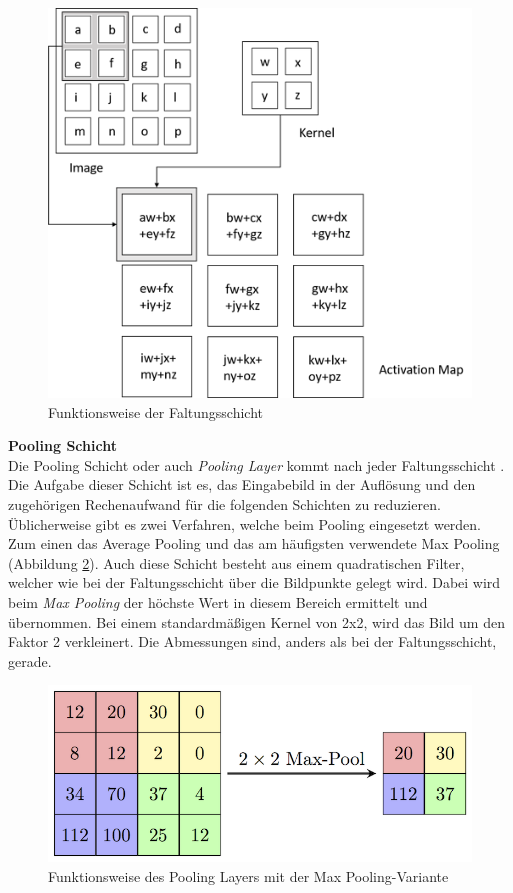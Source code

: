 \begin{figure}
	[h]
	\centering
	\includegraphics[scale=0.55]{Sources/CNN.png}
	\caption{Funktionsweise der Faltungsschicht \cite[330]{goodfellow2016deep}}
	\label{img:faltungsschicht}
\end{figure}
\newpage
\textbf{Pooling Schicht}\\
Die Pooling Schicht oder auch \textit{Pooling Layer} kommt nach jeder Faltungsschicht \cite[336f.]{goodfellow2016deep}. Die Aufgabe dieser Schicht ist es, das Eingabebild in der Auflösung und den zugehörigen Rechenaufwand für die folgenden Schichten zu reduzieren. Üblicherweise gibt es zwei Verfahren, welche beim Pooling eingesetzt werden. Zum einen das Average Pooling und das am häufigsten verwendete Max Pooling (Abbildung \ref{img:maxpooling}). Auch diese Schicht besteht aus einem quadratischen Filter, welcher wie bei der Faltungsschicht über die Bildpunkte gelegt wird. Dabei wird beim \textit{Max Pooling} der höchste Wert in diesem Bereich ermittelt und übernommen. Bei einem standardmäßigen Kernel von 2x2, wird das Bild um den Faktor 2 verkleinert. Die Abmessungen sind, anders als bei der Faltungsschicht, gerade.
\begin{figure}
	[h]
	\centering
	\includegraphics[scale=1.3]{Sources/MaxpoolSample2.png}
	\caption{Funktionsweise des Pooling Layers mit der Max Pooling-Variante \cite{pooling2018layer}}
	\label{img:maxpooling}
\end{figure}\\
